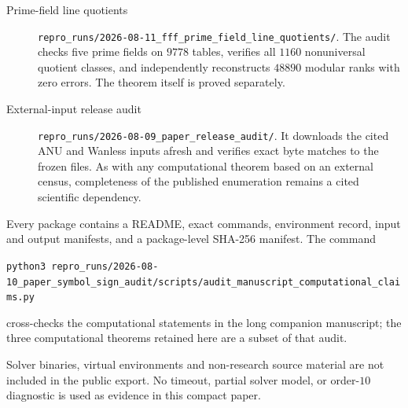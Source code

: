 \begin{description}
\item[Prime-field line quotients]
\nolinkurl{repro_runs/2026-08-11_fff_prime_field_line_quotients/}.
The audit checks five prime fields on $9778$ tables, verifies all $1160$
nonuniversal quotient classes, and independently reconstructs $48890$
modular ranks with zero errors.  The theorem itself is proved separately.

\item[External-input release audit]
\nolinkurl{repro_runs/2026-08-09_paper_release_audit/}.
It downloads the cited ANU and Wanless inputs afresh and verifies exact byte
matches to the frozen files.  As with any computational theorem based on an
external census, completeness of the published enumeration remains a cited
scientific dependency.
\end{description}

Every package contains a README, exact commands, environment record, input
and output manifests, and a package-level SHA-256 manifest.  The command
\begin{center}
\small\texttt{python3 }\nolinkurl{repro_runs/2026-08-10_paper_symbol_sign_audit/scripts/audit_manuscript_computational_claims.py}
\end{center}
cross-checks the computational statements in the long companion manuscript;
the three computational theorems retained here are a subset of that audit.

Solver binaries, virtual environments and non-research source material are not included in the public export.  No timeout, partial solver model,
or order-$10$ diagnostic is used as evidence in this compact paper.
